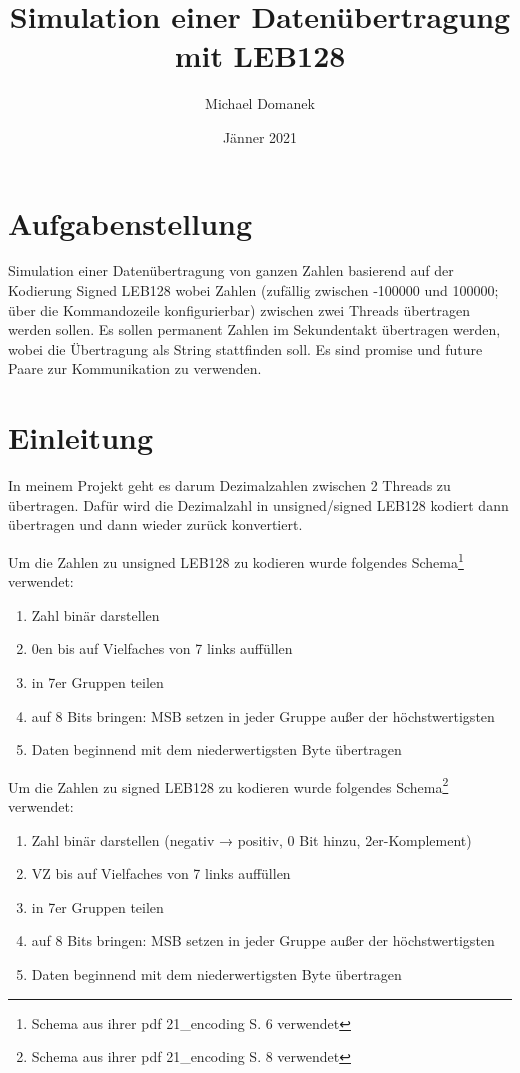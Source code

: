 \documentclass{article}
\title{Simulation einer Datenübertragung mit LEB128}
\author{Michael Domanek}
\date{Jänner 2021}
\begin{document}
\maketitle

\newpage

\tableofcontents

\newpage

\section{Aufgabenstellung}
Simulation einer Datenübertragung von ganzen Zahlen basierend auf der Kodierung Signed LEB128 wobei Zahlen (zufällig zwischen ‐100000 und 100000; über die Kommandozeile konfigurierbar) zwischen zwei Threads übertragen werden sollen. Es sollen permanent Zahlen im Sekundentakt übertragen werden, wobei die Übertragung als String stattfinden soll. Es sind promise und future Paare zur Kommunikation zu verwenden.

\section{Einleitung}
In meinem Projekt geht es darum Dezimalzahlen zwischen 2 Threads zu übertragen.
Dafür wird die Dezimalzahl in unsigned/signed LEB128 kodiert dann übertragen und dann wieder zurück konvertiert.

Um die Zahlen zu unsigned LEB128 zu kodieren wurde folgendes Schema\footnote{Schema aus ihrer pdf 21\_encoding S. 6 verwendet} verwendet: 
\begin{enumerate}
\item Zahl binär darstellen
\item 0en bis auf Vielfaches von 7 links auffüllen
\item in 7er Gruppen teilen
\item auf 8 Bits bringen: MSB setzen in jeder Gruppe außer der höchstwertigsten
\item Daten beginnend mit dem niederwertigsten Byte übertragen
\end{enumerate}

Um die Zahlen zu signed LEB128 zu kodieren wurde folgendes Schema\footnote{Schema aus ihrer pdf 21\_encoding S. 8 verwendet} verwendet: 
\begin{enumerate}
\item Zahl binär darstellen (negativ → positiv, 0 Bit hinzu, 2er-Komplement)
\item VZ bis auf Vielfaches von 7 links auffüllen
\item in 7er Gruppen teilen
\item auf 8 Bits bringen: MSB setzen in jeder Gruppe außer der höchstwertigsten
\item Daten beginnend mit dem niederwertigsten Byte übertragen
\end{enumerate}
\end{document}
